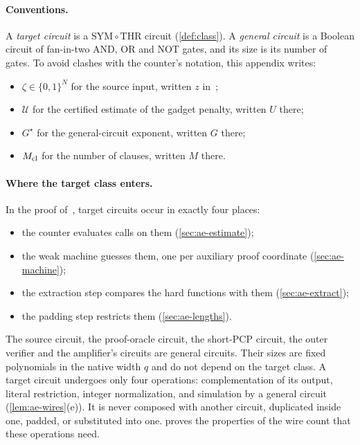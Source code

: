 \documentclass[11pt,letterpaper]{article}
\theoremstyle{definition}
\theoremstyle{remark}
\newcommand{\THR}{\mathrm{THR}}
\newcommand{\SYM}{\mathrm{SYM}}
\begin{document}
\paragraph{Conventions.} A \emph{target circuit} is a \(\SYM\circ\THR\)
circuit (\cref{def:class}). A \emph{general circuit} is a Boolean
circuit of fan-in-two AND, OR and NOT gates, and its size is its number
of gates. To avoid clashes with the counter's notation, this appendix
writes:
\begin{itemize}
\item \(\zeta\in\{0,1\}^N\) for the source input, written \(z\)
in~\cite{NagCG};
\item \(\mathcal U\) for the certified estimate of the gadget penalty,
written \(U\) there;
\item \(G^\star\) for the general-circuit exponent, written \(G\) there;
\item \(M_{\rm cl}\) for the number of clauses, written \(M\) there.
\end{itemize}

\paragraph{Where the target class enters.} In the proof
of~\cite[Theorem~1.2]{NagCG}, target circuits occur in exactly four
places:
\begin{itemize}
\item the counter evaluates calls on them (\cref{sec:ae-estimate});
\item the weak machine guesses them, one per auxiliary proof coordinate
(\cref{sec:ae-machine});
\item the extraction step compares the hard functions with them
(\cref{sec:ae-extract});
\item the padding step restricts them (\cref{sec:ae-lengths}).
\end{itemize}
The source circuit, the proof-oracle circuit, the short-PCP circuit,
the outer verifier and the amplifier's circuits are general circuits.
Their sizes are fixed polynomials in the native width \(q\) and do not
depend on the target class. A target circuit undergoes only four operations: complementation of its output, literal restriction, integer normalization, and simulation by a general circuit (\cref{lem:ae-wires}(e)). It is never composed with another circuit,
duplicated inside one, padded, or substituted into one.
 proves the properties of the wire count that these
operations need.
\end{document}
